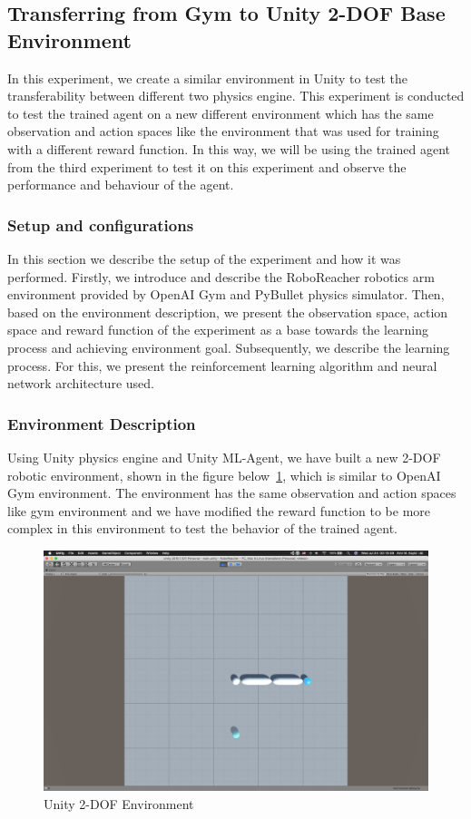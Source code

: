 
\subsection{Transferring from Gym to Unity 2-DOF Base Environment}

In this experiment, we create a similar environment in Unity to test the transferability between different two physics engine. This experiment is conducted to test the trained agent on a new different environment which has the same observation and action spaces like the environment that was used for training with a different reward function. In this way, we will be using the trained agent from the third experiment to test it on this experiment and observe the performance and behaviour of the agent.

\subsubsection{Setup and configurations}

In this section we describe the setup of the experiment and how it was performed. Firstly, we introduce and describe the RoboReacher robotics arm environment provided by OpenAI Gym and PyBullet physics simulator. Then, based on the environment description, we present the observation space, action space and reward function of the experiment as a base towards the learning process and achieving environment goal. Subsequently, we describe the learning process. For this, we present the reinforcement learning algorithm and neural network architecture used.


\subsubsection{Environment Description}
Using Unity physics engine and Unity ML-Agent, we have built a new 2-DOF robotic environment, shown in the figure below~\ref{fig:unity_reacher}, which is similar to OpenAI Gym environment. The environment has the same observation and action spaces like gym environment and we have modified the reward function to be more complex in this environment to test the behavior of the trained agent.

\begin{figure}[!htb]
		\centering
				\includegraphics[width=0.7\linewidth]{figures/envs/unity_roboreacher.png}
				\caption{Unity 2-DOF Environment}
				\label{fig:unity_reacher}
\end{figure}

